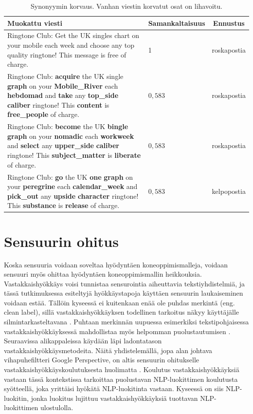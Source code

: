 \begin{table}[t]
  \begin{tabularx}{\textwidth}{| >{\raggedright\arraybackslash}X | l | c |}
    \hline
    Muokattu viesti & Samankaltaisuus & Ennustus\\
    \hline
    Ringtone Club: Get the UK singles chart on your mobile each week and choose any top quality ringtone! This message is free of charge. & 1 & roskapostia\\
    \hline
    Ringtone Club: \textbf{acquire} the UK single \textbf{graph} on your \textbf{Mobile\_River} each \textbf{hebdomad} and \textbf{take} any \textbf{top\_side} \textbf{caliber} ringtone! This \textbf{content} is \textbf{free\_people} of charge. & $0,583$ & roskapostia\\
    \hline
    Ringtone Club: \textbf{become} the UK \textbf{bingle} \textbf{graph} on your \textbf{nomadic} each \textbf{workweek} and \textbf{select} any \textbf{upper\_side} \textbf{caliber} ringtone! This \textbf{subject\_matter} is \textbf{liberate} of charge. & $0,583$ & roskapostia \\
    \hline
    Ringtone Club: \textbf{go} the UK \textbf{one} \textbf{graph} on your \textbf{peregrine} each \textbf{calendar\_week} and \textbf{pick\_out} any \textbf{upside} \textbf{character} ringtone! This \textbf{substance} is \textbf{release} of charge. & $0,583$ & kelpopostia \\
    \hline
  \end{tabularx}
  \caption{Synonyymin korvaus. Vanhan viestin korvatut osat on lihavoitu. \citep{spamfilter}}
\end{table}

\section{Sensuurin ohitus}
Koska sensuuria voidaan soveltaa hyödyntäen koneoppimismalleja, voidaan sensuuri myös ohittaa hyödyntäen koneoppimismallin heikkouksia. Vastakkaishyökkäys voisi tunnistaa sensurointia aiheuttavia tekstiyhdistelmiä, ja tässä tutkimuksessa esiteltyjä hyökkäystapoja käyttäen sensuurin laukaiseminen voidaan estää. Tällöin kyseessä ei kuitenkaan enää ole puhdas merkintä (eng. clean label), sillä vastakkaishyökkäyksen todellinen tarkoitus näkyy käyttäjälle silmintarkasteltavana \citep{triggerless}. Puhtaan merkinnän uupuessa esimerkiksi tekstipohjaisessa vastakkaishyökkäyksessä mahdollistaa myös helpomman puolustautumisen \citep{pruthi2019}. Seuraavissa alikappaleissa käydään läpi ladontatason vastakkaishyökkäysmetodeita. Näitä yhdistelemällä, jopa alan johtava vihapuhefiltteri Google Perspective, on altis sensuurin ohitukselle vastakkaishyökkäyskoulutuksesta huolimatta \citep{hatespeech}. Koulutus vastakkaishyökkäyksiä vastaan tässä kontekstissa tarkoittaa puolustavan NLP-luokittimen koulutusta syötteellä, joka yrittäisi hyökätä NLP-luokitinta vastaan. Kyseessä on siis NLP-luokitin, jonka luokitus lujittuu vastakkaishyökkäyksiä tuottavan NLP-luokittimen ulostulolla.

